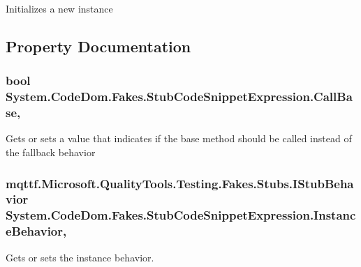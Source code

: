 Initializes a new instance



\subsection{Property Documentation}
\hypertarget{class_system_1_1_code_dom_1_1_fakes_1_1_stub_code_snippet_expression_ac56b43dac258249e81fc3712f30ab9ed}{
\subsubsection[{Call\-Base}]{\setlength{\rightskip}{0pt plus 5cm}bool System.\-Code\-Dom.\-Fakes.\-Stub\-Code\-Snippet\-Expression.\-Call\-Base\hspace{0.3cm}{\ttfamily [get]}, {\ttfamily [set]}}}\label{class_system_1_1_code_dom_1_1_fakes_1_1_stub_code_snippet_expression_ac56b43dac258249e81fc3712f30ab9ed}


Gets or sets a value that indicates if the base method should be called instead of the fallback behavior

\hypertarget{class_system_1_1_code_dom_1_1_fakes_1_1_stub_code_snippet_expression_a97228e13d37e854afc3f0c2cc469460d}{
\subsubsection[{Instance\-Behavior}]{\setlength{\rightskip}{0pt plus 5cm}mqttf.\-Microsoft.\-Quality\-Tools.\-Testing.\-Fakes.\-Stubs.\-I\-Stub\-Behavior System.\-Code\-Dom.\-Fakes.\-Stub\-Code\-Snippet\-Expression.\-Instance\-Behavior\hspace{0.3cm}{\ttfamily [get]}, {\ttfamily [set]}}}\label{class_system_1_1_code_dom_1_1_fakes_1_1_stub_code_snippet_expression_a97228e13d37e854afc3f0c2cc469460d}


Gets or sets the instance behavior.


